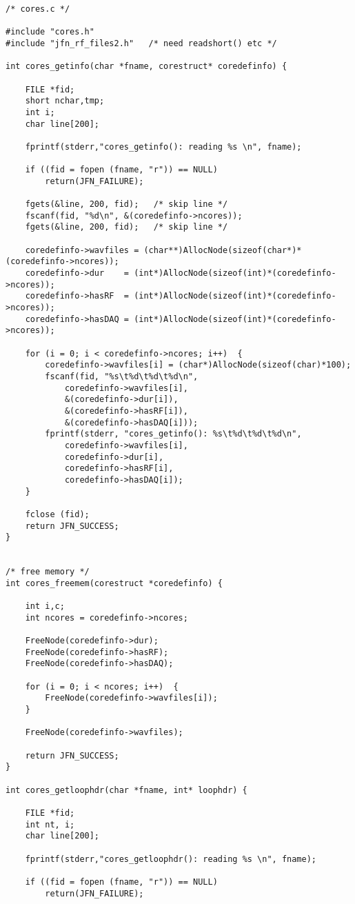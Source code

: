 \begin{lstlisting}
/* cores.c */

#include "cores.h"
#include "jfn_rf_files2.h"   /* need readshort() etc */

int cores_getinfo(char *fname, corestruct* coredefinfo) {

	FILE *fid;
	short nchar,tmp;
	int i;
	char line[200];

	fprintf(stderr,"cores_getinfo(): reading %s \n", fname);

	if ((fid = fopen (fname, "r")) == NULL)
		return(JFN_FAILURE);

	fgets(&line, 200, fid);   /* skip line */
	fscanf(fid, "%d\n", &(coredefinfo->ncores));
	fgets(&line, 200, fid);   /* skip line */

	coredefinfo->wavfiles = (char**)AllocNode(sizeof(char*)*(coredefinfo->ncores));
	coredefinfo->dur    = (int*)AllocNode(sizeof(int)*(coredefinfo->ncores));
	coredefinfo->hasRF  = (int*)AllocNode(sizeof(int)*(coredefinfo->ncores));
	coredefinfo->hasDAQ = (int*)AllocNode(sizeof(int)*(coredefinfo->ncores));

	for (i = 0; i < coredefinfo->ncores; i++)  {
		coredefinfo->wavfiles[i] = (char*)AllocNode(sizeof(char)*100);
		fscanf(fid, "%s\t%d\t%d\t%d\n", 
			coredefinfo->wavfiles[i], 
			&(coredefinfo->dur[i]),
			&(coredefinfo->hasRF[i]),
			&(coredefinfo->hasDAQ[i]));
		fprintf(stderr, "cores_getinfo(): %s\t%d\t%d\t%d\n", 
			coredefinfo->wavfiles[i], 
			coredefinfo->dur[i],
			coredefinfo->hasRF[i],
			coredefinfo->hasDAQ[i]);
	}

	fclose (fid);
	return JFN_SUCCESS;
}


/* free memory */
int cores_freemem(corestruct *coredefinfo) {

	int i,c;
	int ncores = coredefinfo->ncores;

	FreeNode(coredefinfo->dur);
	FreeNode(coredefinfo->hasRF);
	FreeNode(coredefinfo->hasDAQ);

	for (i = 0; i < ncores; i++)  {
		FreeNode(coredefinfo->wavfiles[i]);
	}

	FreeNode(coredefinfo->wavfiles);

	return JFN_SUCCESS;
}

int cores_getloophdr(char *fname, int* loophdr) {

	FILE *fid;
	int nt, i;
	char line[200];

	fprintf(stderr,"cores_getloophdr(): reading %s \n", fname);

	if ((fid = fopen (fname, "r")) == NULL)
		return(JFN_FAILURE);


\end{lstlisting}
